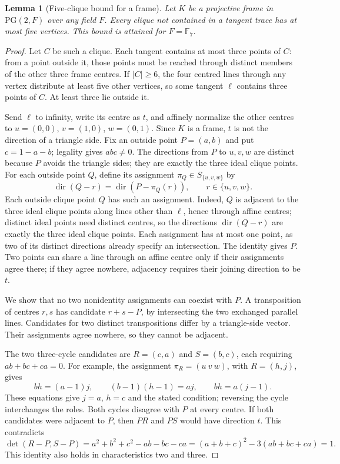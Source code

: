 \documentclass[11pt]{article}
\newtheorem{lemma}[theorem]{Lemma}
\theoremstyle{definition}
\theoremstyle{remark}
\newcommand{\F}{\mathbb F}
\newcommand{\PG}{\mathrm{PG}}
\begin{document}
\begin{lemma}[Five-clique bound for a frame]\label{lem:frame-clique}
Let $K$ be a projective frame in $\PG(2,F)$ over any field $F$. Every
clique not contained in a tangent trace has at most five vertices. This
bound is attained for $F=\F_7$.
\end{lemma}
\begin{proof}
Let $C$ be such a clique. Each tangent contains at most three points of
$C$: from a point outside it, those points must be reached through distinct
members of the other three frame centres. If $|C|\ge6$, the four centred
lines through any vertex distribute at least five other vertices, so some
tangent $\ell$ contains three points of $C$. At least three lie outside it.

Send $\ell$ to infinity, write its centre as $t$, and affinely normalize
the other centres to $u=(0,0)$, $v=(1,0)$, $w=(0,1)$.
Since $K$ is a frame, $t$ is not the direction of a triangle side.
Fix an outside point $P=(a,b)$ and put $c=1-a-b$; legality gives $abc\ne0$.
The directions from $P$ to $u,v,w$ are distinct because $P$ avoids
the triangle sides; they are exactly the three ideal clique points.
For each outside point $Q$, define its assignment $\pi_Q\in S_{\{u,v,w\}}$ by
\[
 \operatorname{dir}(Q-r)=\operatorname{dir}(P-\pi_Q(r)),
 \qquad r\in\{u,v,w\}.
\] Each outside clique point $Q$ has such an assignment. Indeed, $Q$ is
adjacent to the three ideal clique points along lines other than $\ell$,
hence through affine centres; distinct ideal points need distinct
centres, so the directions $\operatorname{dir}(Q-r)$ are exactly the
three ideal clique points.
Each assignment has at most one point,
as two of its distinct directions already specify an intersection.
The identity gives $P$. Two points can share a line through an affine
centre only if their assignments agree there; if they agree nowhere,
adjacency requires their joining direction to be $t$.

We show that no two nonidentity assignments can coexist with $P$.
A transposition of centres $r,s$ has candidate $r+s-P$, by intersecting
the two exchanged parallel lines. Candidates for two distinct
transpositions differ by a triangle-side vector. Their assignments agree
nowhere, so they cannot be adjacent.

The two three-cycle candidates are $R=(c,a)$ and $S=(b,c)$, each requiring
$ab+bc+ca=0$. For example, the assignment $\pi_R=(u\ v\ w)$, with $R=(h,j)$, gives
\[
 bh=(a-1)j,\qquad (b-1)(h-1)=aj,\qquad bh=a(j-1).
\]
These equations give $j=a$, $h=c$ and the stated condition; reversing
the cycle interchanges the roles. Both cycles disagree with $P$ at every
centre. If both candidates were adjacent to $P$, then $PR$ and $PS$
would have direction $t$. This contradicts
\[
 \det(R-P,S-P)=a^2+b^2+c^2-ab-bc-ca
             =(a+b+c)^2-3(ab+bc+ca)=1.
\]
This identity also holds in characteristics two and three.


\end{proof}
\end{document}
